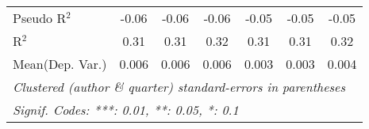 \begin{tabular}{lcccccc}
   Pseudo R$^2$         & -0.06         & -0.06         & -0.06          & -0.05    & -0.05         & -0.05\\  
   R$^2$                & 0.31          & 0.31          & 0.32           & 0.31     & 0.31          & 0.32\\  
Mean(Dep. Var.) & 0.006 & 0.006 & 0.006 & 0.003 & 0.003 & 0.004 \\
   \midrule \midrule
   \multicolumn{7}{l}{\emph{Clustered (author \& quarter) standard-errors in parentheses}}\\
   \multicolumn{7}{l}{\emph{Signif. Codes: ***: 0.01, **: 0.05, *: 0.1}}\\
\end{tabular}
\par\endgroup
